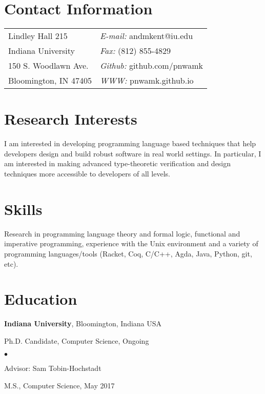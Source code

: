 \documentclass[margin,line]{res}
\newenvironment{list1}{
  \begin{list}{\ding{113}}{%
      \setlength{\itemsep}{0in}
      \setlength{\parsep}{0in} \setlength{\parskip}{0in}
      \setlength{\topsep}{0in} \setlength{\partopsep}{0in} 
      \setlength{\leftmargin}{0.17in}}}{\end{list}}
\newenvironment{list2}{
  \begin{list}{$\bullet$}{%
      \setlength{\itemsep}{0in}
      \setlength{\parsep}{0in} \setlength{\parskip}{0in}
      \setlength{\topsep}{0in} \setlength{\partopsep}{0in} 
      \setlength{\leftmargin}{0.2in}}}{\end{list}}
\begin{document}

\begin{resume}
\section{\sc Contact Information}
\vspace{.05in}
\begin{tabular}{@{}p{2in}p{4in}}
Lindley Hall 215           & {\it E-mail:} andmkent@iu.edu \\
Indiana University         & {\it Fax:}  (812) 855-4829 \\
150 S. Woodlawn Ave.       & {\it Github:} github.com/pnwamk  \\       
Bloomington, IN 47405      & {\it WWW:} pnwamk.github.io \\     
\end{tabular}


\section{\sc Research Interests}
I am interested in developing programming language based techniques
that help developers design and build robust software in real world
settings.  In particular, I am interested in making advanced
type-theoretic verification and design techniques more accessible to
developers of all levels.

\section{\sc Skills}
Research in programming language theory and formal logic, functional
and imperative programming, experience with the Unix environment and a
variety of programming languages/tools (Racket, Coq, C/C++, Agda,
Java, Python, git, etc).

\section{\sc Education}
{\bf Indiana University}, Bloomington, Indiana USA\\
\vspace*{-.1in}
\begin{list1}
\item[] Ph.D. Candidate, Computer Science, Ongoing
\begin{list2}
\item[] Advisor:  Sam Tobin-Hochstadt
\end{list2}
\vspace*{.05in}
\item[] M.S., Computer Science,  May 2017
\end{list1}


\end{resume}
\end{document}
